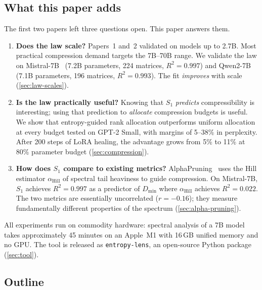 \documentclass[11pt,a4paper]{article}
\newcommand{\Dmin}{D_{\min}}
\newcommand{\Svn}{S_1}
\begin{document}
\subsection{What this paper adds}
\label{sec:intro-contributions}

The first two papers left three questions open.  This paper answers
them.

\begin{enumerate}[leftmargin=2em, itemsep=3pt]
  \item \textbf{Does the law scale?}
    Papers~1 and~2 validated on models up to 2.7B.  Most practical
    compression demand targets the 7B--70B range.  We validate the
    law on Mistral-7B~\citep{jiang2023mistral} (7.2B parameters, 224
    matrices, $R^2 = 0.997$) and Qwen2-7B~\citep{yang2024qwen2}
    (7.1B parameters, 196 matrices, $R^2 = 0.993$).  The fit
    \emph{improves} with scale (\cref{sec:law-scales}).

  \item \textbf{Is the law practically useful?}
    Knowing that $\Svn$ \emph{predicts} compressibility is
    interesting; using that prediction to \emph{allocate} compression
    budgets is useful.  We show that entropy-guided rank allocation
    outperforms uniform allocation at every budget tested on GPT-2
    Small, with margins of 5--38\% in perplexity.  After 200 steps
    of LoRA healing, the advantage grows from 5\% to 11\% at 80\%
    parameter budget (\cref{sec:compression}).

  \item \textbf{How does $\Svn$ compare to existing metrics?}
    AlphaPruning~\citep{lu2024alphapruning} uses the Hill estimator
    $\alpha_{\text{Hill}}$ of spectral tail heaviness to guide
    compression.  On Mistral-7B, $\Svn$ achieves $R^2 = 0.997$ as a
    predictor of $\Dmin$ where $\alpha_{\text{Hill}}$ achieves $R^2 =
    0.022$.  The two metrics are essentially uncorrelated ($r =
    -0.16$); they measure fundamentally different properties of the
    spectrum (\cref{sec:alpha-pruning}).
\end{enumerate}

All experiments run on commodity hardware: spectral analysis of a 7B
model takes approximately 45 minutes on an Apple~M1 with 16\,GB
unified memory and no GPU.  The tool is released as
\texttt{entropy-lens}, an open-source Python package
(\cref{sec:tool}).

\subsection{Outline}
\label{sec:intro-outline}
\end{document}
